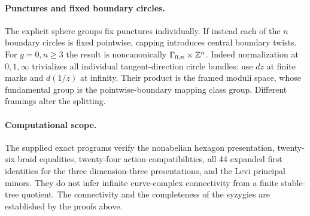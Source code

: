 \paragraph{Punctures and fixed boundary circles.}
The explicit sphere groups fix
punctures individually. If instead
each of the \(n\) boundary circles
is fixed pointwise, capping
introduces central boundary
twists. For \(g=0,n\geq3\)
the result is noncanonically
\(\Gamma_{0,n}\times\mathbb Z^n\).
Indeed normalization at
\(0,1,\infty\) trivializes
all individual tangent-direction
circle bundles: use \(dz\)
at finite marks and \(d(1/z)\)
at infinity. Their product
is the framed moduli space,
whose fundamental group is
the pointwise-boundary mapping
class group. Different framings
alter the splitting.

\paragraph{Computational scope.}
The supplied exact programs
verify the nonabelian hexagon
presentation, twenty-six braid
equalities, twenty-four action
compatibilities, all 44
expanded first identities for
the three dimension-three
presentations, and the Levi
principal minors.
They do not infer infinite
curve-complex connectivity
from a finite stable-tree
quotient. The connectivity
and the completeness of the
syzygies are established by
the proofs above.

